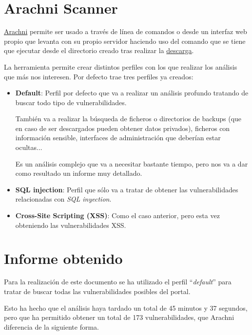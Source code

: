\documentclass{\ClassPath/viu-tfm-template}
\begin{document}
\section{Arachni Scanner}
\href{https://www.arachni-scanner.com/}{Arachni} permite ser usado a través de línea de comandos o desde un interfaz web propio que levanta con su propio servidor haciendo uso del comando  que se tiene que ejecutar desde el directorio creado tras realizar la \href{https://www.arachni-scanner.com/download/}{descarga}.

La herramienta permite crear distintos perfiles con los que realizar los análisis que más nos interesen. Por defecto trae tres perfiles ya creados:

\begin{itemize}
    \item \textbf{Default}: Perfil por defecto que va a realizar un análisis profundo tratando de buscar todo tipo de vulnerabilidades.

    También va a realizar la búsqueda de ficheros o directorios de backups (que en caso de ser descargados pueden obtener datos privados), ficheros con información sensible, interfaces de administración que deberían estar ocultas...

    Es un análisis complejo que va a necesitar bastante tiempo, pero nos va a dar como resultado un informe muy detallado.

    \item \textbf{SQL injection}: Perfil que sólo va a tratar de obtener las vulnerabilidades relacionadas con \textit{SQL inyection}.

    \item \textbf{Cross-Site Scripting (XSS)}: Como el caso anterior, pero esta vez obteniendo las vulnerabilidades XSS.
\end{itemize}

\section{Informe obtenido}

Para la realización de este documento se ha utilizado el perfil “\textit{default}” para tratar de buscar todas las vulnerabilidades posibles del portal.

Esto ha hecho que el análisis haya tardado un total de 45 minutos y 37 segundos, pero que ha permitido obtener un total de 173 vulnerabilidades, que Arachni diferencia de la siguiente forma.
\end{document}
